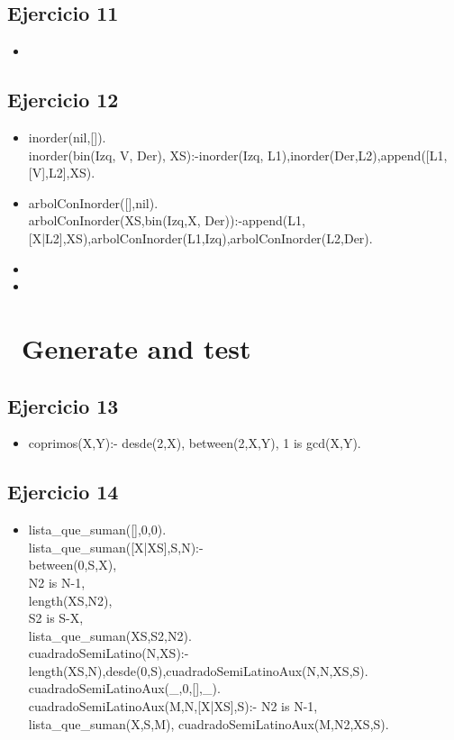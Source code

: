 \documentclass[10pt,a4paper]{article}
\begin{document}
\subsection{Ejercicio 11}
\begin{itemize}
\item
\end{itemize}

\subsection{Ejercicio 12}
\begin{itemize}
\item inorder(nil,[]). \\
inorder(bin(Izq, V, Der), XS):-inorder(Izq, L1),inorder(Der,L2),append([L1,[V],L2],XS).
\item arbolConInorder([],nil). \\
arbolConInorder(XS,bin(Izq,X, Der)):-append(L1,[X|L2],XS),arbolConInorder(L1,Izq),arbolConInorder(L2,Der).
\item 
\item 
\end{itemize}
\section*{\ Generate and test}

\subsection{Ejercicio 13}
\begin{itemize}
\item coprimos(X,Y):- desde(2,X), between(2,X,Y), 1 is gcd(X,Y).
\end{itemize}

\subsection{Ejercicio 14}
\begin{itemize}
\item
lista_que_suman([],0,0). \\
lista_que_suman([X|XS],S,N):- \\
    between(0,S,X),  \\
    N2 is N-1, \\
    length(XS,N2),  \\
    S2 is S-X,  \\
    lista_que_suman(XS,S2,N2). \\
cuadradoSemiLatino(N,XS):-length(XS,N),desde(0,S),cuadradoSemiLatinoAux(N,N,XS,S). \\
cuadradoSemiLatinoAux(_,0,[],_). \\
cuadradoSemiLatinoAux(M,N,[X|XS],S):- N2 is N-1, lista_que_suman(X,S,M), cuadradoSemiLatinoAux(M,N2,XS,S).
\end{itemize}
\end{document}
